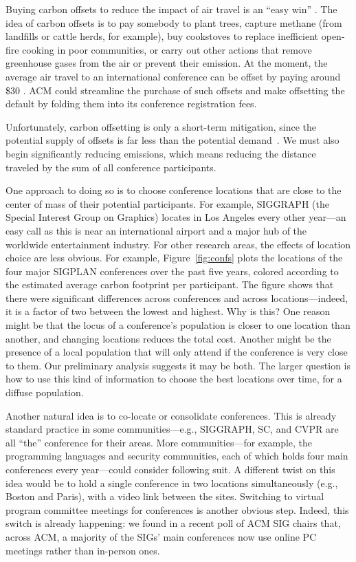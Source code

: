 \documentclass[12pt]{article}
\begin{document}
Buying carbon offsets to reduce the impact of air travel is an ``easy win''
\cite{CarbonOFfsetReport}.  The idea of carbon offsets is to pay somebody to plant trees, capture
methane (from landfills or cattle herds, for example), buy cookstoves to
replace inefficient open-fire cooking in poor communities, or carry out
other actions that remove greenhouse gases from the air or prevent their
emission. At the moment, the average air travel to an international
conference can be offset by paying around \$30 \cite{CarbonOFfsetReport}.
ACM could streamline 
the purchase of such offsets and make offsetting the default by folding them
into its conference registration fees.

Unfortunately, carbon offsetting is only a short-term mitigation, since the
potential supply of offsets is far less than the potential demand~\cite{SEI-Report}. We
must also begin significantly reducing emissions, which means reducing the
distance traveled by the sum of all conference participants.

One approach to doing so is to choose conference locations that are close to
the center of mass of their potential participants.  For example, SIGGRAPH
(the Special Interest Group on Graphics) locates in Los Angeles every other
year---an easy call as this is near an international airport and a major hub
of the worldwide entertainment industry. For other research areas, the
effects of location choice are less obvious. For example,
Figure~\ref{fig:confs} plots the 
locations of the four major SIGPLAN conferences over the past five years,
colored according to the estimated average carbon footprint per
participant. The figure shows that there were significant differences across
conferences and across locations---indeed, it is a factor of two between the
lowest and highest. Why is this? One reason might be that the locus of a
conference’s population is closer to one location than another, and changing
locations reduces the total cost. Another might be the presence of a local
population that will only attend if the conference is very close to
them. Our preliminary analysis suggests it may be both. The larger question
is how to use this kind of information to choose the best locations over
time, for a diffuse population.

Another natural idea is to co-locate or consolidate conferences.  This is
already standard practice in some communities---e.g., SIGGRAPH, SC, and CVPR
are all ``the'' conference for their areas.  More communities---for example,
the programming languages and security communities, each of which holds four
main conferences every year---could consider following suit.  A different
twist on this idea would be to hold a single conference in two locations
simultaneously (e.g., Boston and Paris), with a video link between the
sites. Switching to virtual program committee meetings for conferences is
another obvious step.  Indeed, this switch is already happening: we found in
a recent poll of ACM SIG chairs that, across ACM, a majority of the SIGs’
main conferences now use online PC meetings rather than in-person ones.
\end{document}
